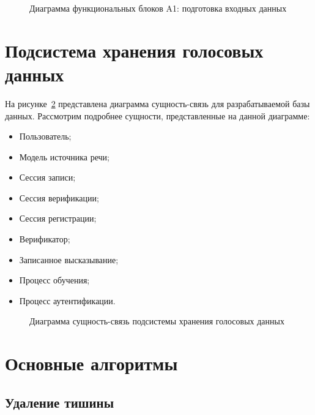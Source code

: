 \begin{figure}
    \caption{Диаграмма функциональных блоков A1: подготовка входных данных}
    \label{fig:idef0_pre}
\end{figure}

\section{Подсистема хранения голосовых данных}

На рисунке~\ref{fig:er_main} представлена диаграмма сущность-связь для разрабатываемой базы данных. Рассмотрим подробнее сущности, представленные на данной диаграмме:

\begin{itemize}
\item Пользователь;
\item Модель источника речи;
\item Сессия записи;
\item Сессия верификации;
\item Сессия регистрации;
\item Верификатор;
\item Записанное высказывание;
\item Процесс обучения;
\item Процесс аутентификации.
\end{itemize}

\begin{figure}
    \caption{Диаграмма сущность-связь подсистемы хранения голосовых данных}
    \label{fig:er_main}
\end{figure}


\section{Основные алгоритмы}

\subsection{Удаление тишины}

